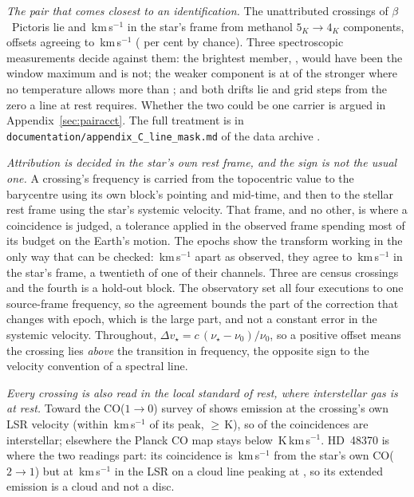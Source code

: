 \emph{The pair that comes closest to an identification.} The \ZmNCross{}
unattributed crossings of $\beta$~Pictoris lie \ZmDvLo{} and
\ZmDvHi\,km\,s$^{-1}$ in the star's frame from methanol $5_K\to4_K$
components, offsets agreeing to \ZmDvAgree\,km\,s$^{-1}$ (\ZmChancePct{} per
cent by chance). Three spectroscopic measurements decide against them: the
brightest member, \ZmBright, would have been the window maximum and is not;
the weaker component is at \ZmRatioObs{} of the stronger where no temperature
allows more than \ZmRatioMax; and both drifts lie \ZmStepsOne{} and
\ZmStepsTwo{} grid steps from the zero a line at rest requires. Whether the
two could be one carrier is argued in Appendix~\ref{sec:pairacct}. The full
treatment is in \texttt{documentation/\allowbreak appendix\_C\_line\_mask.md} of the data
archive \citep{SIdeposit}.

\emph{Attribution is decided in the star's own rest frame, and the sign is
not the usual one.} A crossing's frequency is carried from the topocentric
value to the barycentre using its own block's pointing and mid-time, and then
to the stellar rest frame using the star's systemic velocity. That frame, and
no other, is where a coincidence is judged, a tolerance applied in the
observed frame spending most of its budget on the Earth's motion. The
\FrEpochNEpoch{} \FrEpochStar{} epochs show the transform working in the only
way that can be checked: \FrEpochTopoKms\,km\,s$^{-1}$ apart as observed, they
agree to \FrEpochStelKms\,km\,s$^{-1}$ in the star's frame, a twentieth of one
of their channels. Three are census crossings and the fourth is a hold-out
block. The observatory set all four executions to one source-frame frequency,
so the agreement bounds the part of the correction that changes with epoch,
which is the large part, and not a constant error in the systemic velocity.
Throughout, $\Delta v_\star = c\,(\nu_\star-\nu_0)/\nu_0$, so a positive
offset means the crossing lies \emph{above} the transition
in frequency, the opposite sign to the velocity convention of a spectral line.

\emph{Every crossing is also read in the local standard of rest, where
interstellar gas is at rest.} Toward \LsCloudStars{} the CO($1\to0$) survey
of \citet{DameThaddeus2022,Dame2001} shows emission at the crossing's own LSR
velocity (within \LsCloudDvMax\,km\,s$^{-1}$ of its peak, $\ge$\LsCloudTMin\,K),
so \LsNCloud{} of the \MkNCoinc{} coincidences are interstellar; elsewhere the
Planck CO map \citep{PlanckCO2016} stays below \LsPlanckMax\,K\,km\,s$^{-1}$.
HD~48370 is where the two readings part: its coincidence is
\LsHdDvStar\,km\,s$^{-1}$ from the star's own CO($2\to1$) but at
\LsHdVfeat\,km\,s$^{-1}$ in the LSR on a cloud line peaking at \LsHdVco, so
its extended emission is a cloud and not a disc.


